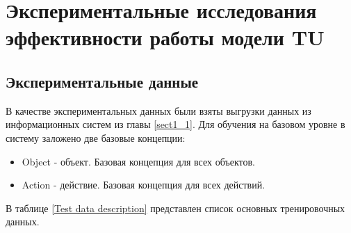 \chapter{Экспериментальные исследования эффективности работы модели TU}


\section{Экспериментальные данные}
В качестве экспериментальных данных были взяты выгрузки данных из информационных систем из главы \ref{sect1_1}. 
Для обучения на базовом уровне в систему заложено две базовые концепции: 
\begin{itemize}
	\item Object - объект. Базовая концепция для всех объектов.
	\item Action - действие. Базовая концепция для всех действий.
\end{itemize} 
В таблице \ref{Test data description} представлен список основных тренировочных данных.

